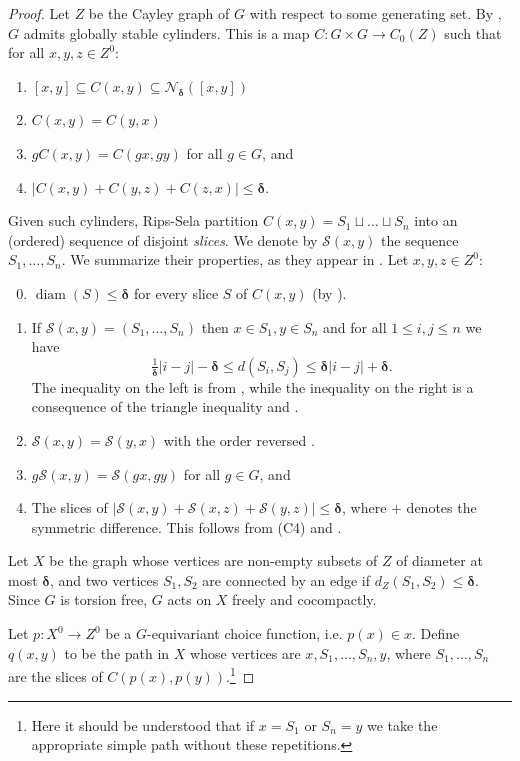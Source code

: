 \documentclass{amsart}
\numberwithin{equation}{section}
\theoremstyle{definition}
\newcommand{\calN}{\mathcal{N}}
\newcommand{\calS}{\mathcal{S}}
\newcommand{\bdelta}{{\boldsymbol\delta}}
\newcommand{\nir}[1]{\todo[inline, color=magenta]{#1}}
\DeclareMathOperator{\diam}{diam}
\begin{document}
\begin{proof}
  Let $Z$ be the Cayley graph of $G$ with respect to some generating set.
  By \cite[Theorem 1.1]{petyt2025stable}, $G$ admits globally stable cylinders. This is a map $C:G\times G\to C_0(Z)$ such that for all $x,y,z\in Z^0$:
  \begin{enumerate}[label = (C\arabic*)]
      \item $[x,y]\subseteq C(x,y)\subseteq \calN_\bdelta([x,y])$
      \item $C(x,y) = C(y,x)$
      \item $gC(x,y)=C(gx,gy)$ for all $g\in G$, and
      \item $|C(x,y) +C(y,z)+C(z,x)|\le \bdelta$.
  \end{enumerate}
  Given such cylinders, Rips-Sela \cite{rips1995canonical} partition $C(x,y) = S_1\sqcup \dots \sqcup S_n$ into an (ordered) sequence of disjoint \emph{slices}.
  We denote by $\calS(x,y)$ the sequence $S_1,\dots,S_n$. We summarize their properties, as they appear in \cite{delzant1995image}. Let $x,y,z\in Z^0$:
  \begin{enumerate}[label = (S\arabic*)]\setcounter{enumi}{-1}
  \item $\diam(S)\le \bdelta$ for every slice $S$ of $C(x,y)$ (by \cite[Lemme I.1 (a)]{delzant1995image}).
  \item  If $\calS(x,y)=(S_1,\dots,S_n)$ then $x\in  S_1 ,y\in S_n$ and for all $1\le i,j\le n$ we have $$\tfrac 1\bdelta|i-j|-\bdelta\le  d(S_i,S_j)\le \bdelta|i-j|+\bdelta.$$
  The inequality on the left is from \cite[Lemme I.1 (a)]{delzant1995image}, while the inequality on the right is a consequence of the triangle inequality and \cite[Lemme I.1 (b)]{delzant1995image}.
  \item $\calS(x,y) = \calS(y,x)$ with the order reversed \cite[Lemma 3.4]{rips1995canonical}.
  \item $g\calS(x,y) = \calS(gx,gy)$ for all $g\in G$, and 
  \item The slices of $|\calS(x,y)+\calS(x,z)+\calS(y,z)|\le \bdelta$, 
  where $+$ denotes the symmetric difference.
This follows from (C4) and \cite[Lemme I.1 (c)]{delzant1995image}.
  \end{enumerate}
  
    Let $X$ be the graph whose vertices are non-empty subsets of $Z$ of diameter at most $\bdelta$, and two vertices $S_1,S_2$ are connected by an edge if $d_Z(S_1,S_2)\le \bdelta$.
    Since $G$ is torsion free, $G$ acts on $X$ freely and cocompactly.

    Let $p:X^0\to Z^0$ be a $G$-equivariant choice function, i.e. $p(x)\in x$.
    Define $q(x,y)$ to be the path in $X$ whose vertices are $x, S_1,\dots,S_n,y$, where $S_1,\dots,S_n$ are the slices of $C(p(x),p(y))$.\footnote{Here it should be understood that if $x=S_1$ or $S_n=y$ we take the appropriate simple path without these repetitions.}
\end{proof}
\end{document}
